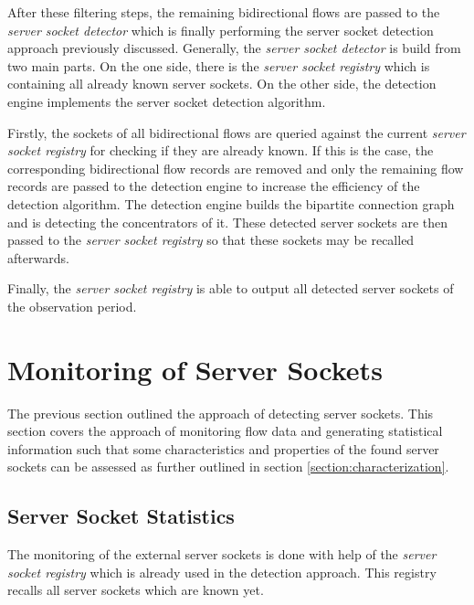 After these filtering steps, the remaining bidirectional flows are passed to the 
\emph{server socket detector} which is finally performing the 
\gls{server socket} detection approach previously discussed. Generally, the 
\emph{server socket detector} is build from two main parts. 
On the one side, there is the \emph{server socket registry} which is 
containing all already known \glspl{server socket}. On the other side, the 
detection engine implements the \gls{server socket} detection algorithm. 

Firstly, the sockets of all bidirectional flows are queried against the current 
\emph{server socket registry} for checking if they are already known. If this is 
the case, the corresponding bidirectional flow records are removed and only the 
remaining flow records are passed to the detection engine to increase the 
efficiency of the detection algorithm. 
The detection engine builds the bipartite connection 
graph and is detecting the concentrators of it. These detected \glspl{server 
socket} are then passed to the \emph{server socket registry} so that these 
sockets may be recalled afterwards. 

Finally, the \emph{server socket registry} is able to output all detected 
\glspl{server socket} of the observation period. 

\newpage
\section{Monitoring of Server Sockets 
\label{section:socket_tracking}}

The previous section outlined the approach of detecting \glspl{server socket}. 
This section covers the approach of monitoring flow data and generating 
statistical information such that some characteristics and properties of the 
found \glspl{server socket} can be assessed as further outlined in section 
\ref{section:characterization}.

\subsection{Server Socket Statistics}

The monitoring of the external 
\glspl{server socket} is done with help of the \emph{server socket registry} 
which is already used in the detection approach. This registry recalls all 
\glspl{server socket} which are known yet. 

